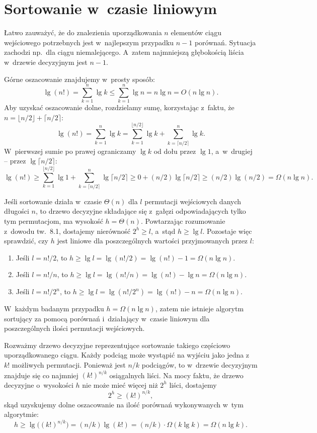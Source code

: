 \chapter{Sortowanie w~czasie liniowym}


\exercise %
Łatwo zauważyć, że do znalezienia uporządkowania $n$ elementów ciągu wejściowego potrzebnych jest w~najlepszym przypadku $n-1$ porównań. Sytuacja zachodzi np.\ dla ciągu niemalejącego. A~zatem najmniejszą głębokością liścia w~drzewie decyzyjnym jest $n-1$.

\exercise %
Górne oszacowanie znajdujemy w~prosty sposób:
\[
	\lg(n!) = \sum_{k=1}^n\lg k \le \sum_{k=1}^n\lg n = n\lg n = O(n\lg n).
\]
Aby uzyskać oszacowanie dolne, rozdzielamy sumę, korzystając z~faktu, że $n=\lfloor n/2\rfloor+\lceil n/2\rceil$:
\[
	\lg(n!) = \sum_{k=1}^n\lg k = \sum_{k=1}^{\lfloor n/2\rfloor}\lg k+\sum_{k=\lceil n/2\rceil}^n\lg k.
\]
W~pierwszej sumie po prawej ograniczamy $\lg k$ od dołu przez $\lg1$, a~w~drugiej -- przez $\lg\lceil n/2\rceil$:
\[
	\lg(n!) \ge \sum_{k=1}^{\lfloor n/2\rfloor}\lg1+\sum_{k=\lceil n/2\rceil}^n\lg\lceil n/2\rceil \ge 0+(n/2)\lg\lceil n/2\rceil \ge (n/2)\lg(n/2) = \Omega(n\lg n).
\]

\exercise %
Jeśli sortowanie działa w~czasie $\Theta(n)$ dla $l$ permutacji wejściowych danych długości $n$, to drzewo decyzyjne składające się z~gałęzi odpowiadających tylko tym permutacjom, ma wysokość $h=\Theta(n)$. Powtarzając rozumowanie z~dowodu tw.~8.1, dostajemy nierówność $2^h\ge l$, a~stąd $h\ge\lg l$. Pozostaje więc sprawdzić, czy $h$ jest liniowe dla poszczególnych wartości przyjmowanych przez $l$:
\begin{enumerate}
	\item Jeśli $l=n!/2$, to $h\ge\lg l=\lg(n!/2)=\lg(n!)-1=\Omega(n\lg n)$.
	\item Jeśli $l=n!/n$, to $h\ge\lg l=\lg(n!/n)=\lg(n!)-\lg n=\Omega(n\lg n)$.
	\item Jeśli $l=n!/2^n$, to $h\ge\lg l=\lg(n!/2^n)=\lg(n!)-n=\Omega(n\lg n)$.
\end{enumerate}
W~każdym badanym przypadku $h=\Omega(n\lg n)$, zatem nie istnieje algorytm sortujący za pomocą porównań i~działający w~czasie liniowym dla poszczególnych ilości permutacji wejściowych.

\exercise %
Rozważmy drzewo decyzyjne reprezentujące sortowanie takiego częściowo uporządkowanego ciągu. Każdy podciąg może wystąpić na wyjściu jako jedna z~$k!$ możliwych permutacji. Ponieważ jest $n/k$ podciągów, to w~drzewie decyzyjnym znajduje się co najmniej $(k!)^{n/k}$ osiągalnych liści. Na mocy faktu, że drzewo decyzyjne o~wysokości $h$ nie może mieć więcej niż $2^h$ liści, dostajemy
\[
	2^h \ge (k!)^{n/k},
\]
skąd uzyskujemy dolne oszacowanie na ilość porównań wykonywanych w~tym algorytmie:
\[
	h \ge \lg\bigl((k!)^{n/k}\bigr) = (n/k)\lg(k!) = (n/k)\cdot\Omega(k\lg k) = \Omega(n\lg k).
\]

